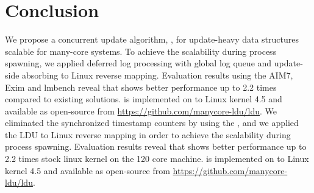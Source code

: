 \section{Conclusion}
\ifkor
We propose a concurrent update algorithm, , for update-heavy data
structures scalable for many-core systems.
To achieve the scalability during process spawning, 
we applied deferred log processing with global log queue and 
update-side absorbing to Linux reverse mapping.
Evaluation results using the AIM7, Exim and lmbench reveal that  shows
better performance up to 2.2 times compared to existing solutions.
 is implemented on to Linux kernel 4.5 and available as open-source
 from \url{https://github.com/manycore-ldu/ldu}.
\else
We eliminated the synchronized timestamp counters by using the , and
we applied the LDU to Linux reverse mapping in order to achieve the scalability
during process spawning.
Evaluation results reveal that  shows better performance up to 2.2 times
stock linux kernel on the 120 core machine.
 is implemented on to Linux kernel 4.5 and available as open-source
 from \url{https://github.com/manycore-ldu/ldu}.
\fi








